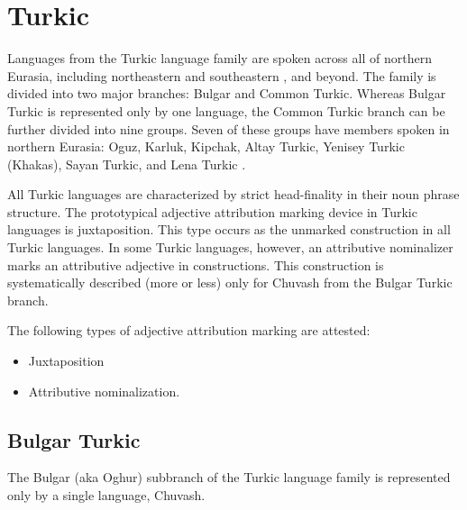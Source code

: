 \section{Turkic}
Languages from the Turkic language family are spoken across all of northern Eurasia, including northeastern and southeastern , and beyond. The family is divided into two major branches: Bulgar and Common Turkic. Whereas Bulgar Turkic is represented only by one language, the Common Turkic branch can be further divided into nine groups. Seven of these groups have members spoken in northern Eurasia: Oguz, Karluk, Kipchak, Altay Turkic, Yenisey Turkic (Khakas), Sayan Turkic, and Lena Turkic \cite[221]{salminen2007}.

All Turkic languages are characterized by strict head-finality in their noun phrase structure. The prototypical adjective attribution marking device in Turkic languages is juxtaposition. This type occurs as the unmarked construction in all Turkic languages. In some Turkic languages, however, an attributive nominalizer marks an attributive adjective in  constructions. This construction is systematically described (more or less) only for Chuvash from the Bulgar Turkic branch.

The following types of adjective attribution marking are attested:
\begin{itemize}
\item Juxtaposition
\item Attributive nominalization.
\end{itemize}

\subsection{Bulgar Turkic}
The Bulgar (aka Oghur) subbranch of the Turkic language family is represented only by a single language, Chuvash.

